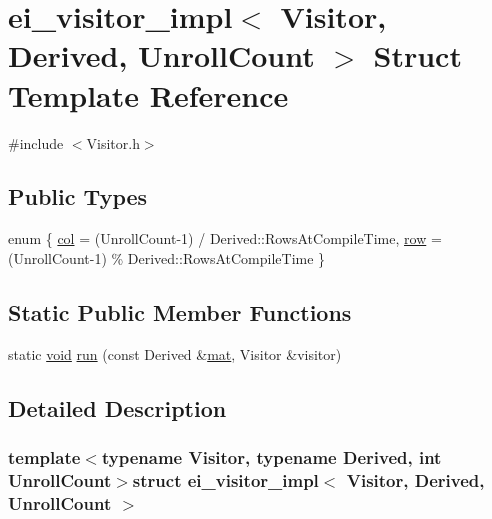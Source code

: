 \hypertarget{structei__visitor__impl}{\section{ei\-\_\-visitor\-\_\-impl$<$ Visitor, Derived, Unroll\-Count $>$ Struct Template Reference}
\label{structei__visitor__impl}
}


{\ttfamily \#include $<$Visitor.\-h$>$}

\subsection*{Public Types}
\begin{DoxyCompactItemize}
\item 
enum \{ \hyperlink{structei__visitor__impl_a2f9f36dac1a05e2200325c60672ab22aa788a3827cf330cffceb56d486bd9a270}{col} = (Unroll\-Count-\/1) / Derived\-:\-:Rows\-At\-Compile\-Time, 
\hyperlink{structei__visitor__impl_a2f9f36dac1a05e2200325c60672ab22aa1d75ff888885a3e44e26f96a9b2dcc6c}{row} = (Unroll\-Count-\/1) \% Derived\-:\-:Rows\-At\-Compile\-Time
 \}
\end{DoxyCompactItemize}
\subsection*{Static Public Member Functions}
\begin{DoxyCompactItemize}
\item 
static \hyperlink{group___u_a_v_objects_plugin_ga444cf2ff3f0ecbe028adce838d373f5c}{void} \hyperlink{structei__visitor__impl_a1dc5bf8a9b658d0323423cb04b3b7afb}{run} (const Derived \&\hyperlink{uavobjecttemplate_8m_a16a51e808b16c46bbfd36da2e37cd123}{mat}, Visitor \&visitor)
\end{DoxyCompactItemize}


\subsection{Detailed Description}
\subsubsection*{template$<$typename Visitor, typename Derived, int Unroll\-Count$>$struct ei\-\_\-visitor\-\_\-impl$<$ Visitor, Derived, Unroll\-Count $>$}



